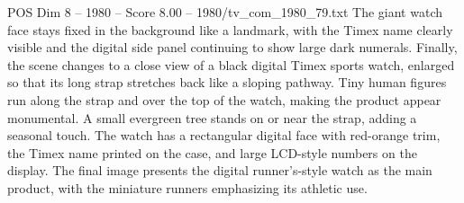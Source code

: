 \begin{textsample}{POS Dim 8 – 1980 – Score 8.00 – 1980/tv\_com\_1980\_79.txt}
The giant watch face stays fixed in the background like a landmark, with the Timex name clearly visible and the digital side panel continuing to show large dark numerals.
Finally, the scene changes to a close view of a black digital Timex sports watch, enlarged so that its long strap stretches back like a sloping pathway.
Tiny human figures run along the strap and over the top of the watch, making the product appear monumental.
A small evergreen tree stands on or near the strap, adding a seasonal touch.
The watch has a rectangular digital face with red-orange trim, the Timex name printed on the case, and large LCD-style numbers on the display.
The final image presents the digital runner’s-style watch as the main product, with the miniature runners emphasizing its athletic use.

\end{textsample}
